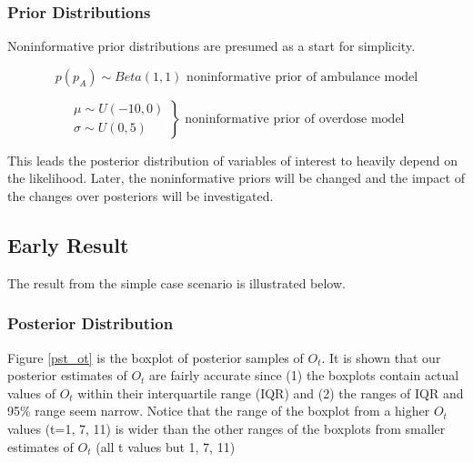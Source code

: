 \documentclass[]{article}
\begin{document}
\subsubsection{Prior Distributions}
\normalsize Noninformative prior distributions are presumed as a start for simplicity. 

\begin{equation}
\label{nonin_prior_amb}
p(p_A) \sim Beta(1,1)
\text{			noninformative prior of ambulance model}
\end{equation} 

\begin{equation}
\label{noninprior_over}
\left.\begin{aligned}
\mu \sim U(-10,0)\\
\sigma \sim U(0,5)
\end{aligned}\right\} 
\text{			noninformative prior of overdose model}
\end{equation}

This leads the posterior distribution of variables of interest to heavily depend on the likelihood. Later, the noninformative priors will be changed and the impact of the changes over posteriors will be investigated. \\

\subsection{Early Result } 

The result from the simple case scenario is illustrated below.

\subsubsection{Posterior Distribution}


Figure \ref{pst_ot} is the boxplot of posterior samples of $O_t$. It is shown that our posterior estimates of  $O_t$ are fairly accurate since (1) the boxplots contain actual values of $O_t$ within their interquartile range (IQR) and (2) the ranges of IQR and 95\% range seem narrow. Notice that the range of the boxplot from a higher $O_t$ values (t=1, 7, 11) is wider than the other ranges of the boxplots from smaller estimates of $O_t$ (all t values but 1, 7, 11)\\
\end{document}
